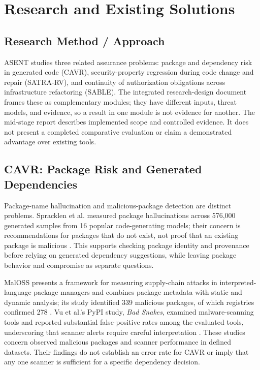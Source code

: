 \chapter{Research and Existing Solutions}

\section{Research Method / Approach}
ASENT studies three related assurance problems: package and dependency risk in generated code (CAVR), security-property regression during code change and repair (SATRA-RV), and continuity of authorization obligations across infrastructure refactoring (SABLE). The integrated research-design document frames these as complementary modules; they have different inputs, threat models, and evidence, so a result in one module is not evidence for another. The mid-stage report describes implemented scope and controlled evidence. It does not present a completed comparative evaluation or claim a demonstrated advantage over existing tools.

\section{CAVR: Package Risk and Generated Dependencies}
Package-name hallucination and malicious-package detection are distinct problems. Spracklen et al. measured package hallucinations across 576,000 generated samples from 16 popular code-generating models; their concern is recommendations for packages that do not exist, not proof that an existing package is malicious \cite{spracklen2025hallucinations}. This supports checking package identity and provenance before relying on generated dependency suggestions, while leaving package behavior and compromise as separate questions.

MalOSS presents a framework for measuring supply-chain attacks in interpreted-language package managers and combines package metadata with static and dynamic analysis; its study identified 339 malicious packages, of which registries confirmed 278 \cite{duan2021maloss}. Vu et al.'s PyPI study, \emph{Bad Snakes}, examined malware-scanning tools and reported substantial false-positive rates among the evaluated tools, underscoring that scanner alerts require careful interpretation \cite{vu2023badsnakes}. These studies concern observed malicious packages and scanner performance in defined datasets. Their findings do not establish an error rate for CAVR or imply that any one scanner is sufficient for a specific dependency decision.

